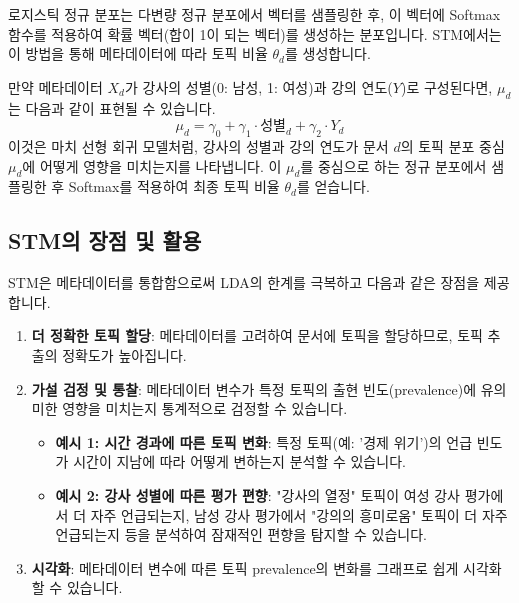 \documentclass[11pt,a4paper]{article}
\theoremstyle{definition}
\begin{document}
\begin{tcolorbox}[definition={로지스틱 정규 분포 (Logistic Normal Distribution)}]
로지스틱 정규 분포는 다변량 정규 분포에서 벡터를 샘플링한 후, 이 벡터에 Softmax 함수를 적용하여 확률 벡터(합이 1이 되는 벡터)를 생성하는 분포입니다. STM에서는 이 방법을 통해 메타데이터에 따라 토픽 비율 $\theta_d$를 생성합니다.
\end{tcolorbox}

\begin{tcolorbox}[example={$\mu_d = X_d \gamma$의 의미}]
만약 메타데이터 $X_d$가 강사의 성별(0: 남성, 1: 여성)과 강의 연도($Y$)로 구성된다면, $\mu_d$는 다음과 같이 표현될 수 있습니다.
\begin{equation*}
\mu_d = \gamma_0 + \gamma_1 \cdot \text{성별}_d + \gamma_2 \cdot Y_d
\end{equation*}
이것은 마치 선형 회귀 모델처럼, 강사의 성별과 강의 연도가 문서 $d$의 토픽 분포 중심 $\mu_d$에 어떻게 영향을 미치는지를 나타냅니다. 이 $\mu_d$를 중심으로 하는 정규 분포에서 샘플링한 후 Softmax를 적용하여 최종 토픽 비율 $\theta_d$를 얻습니다.
\end{tcolorbox}

\subsection{STM의 장점 및 활용}
STM은 메타데이터를 통합함으로써 LDA의 한계를 극복하고 다음과 같은 장점을 제공합니다.

\begin{enumerate}
    \item \textbf{더 정확한 토픽 할당}: 메타데이터를 고려하여 문서에 토픽을 할당하므로, 토픽 추출의 정확도가 높아집니다.
    \item \textbf{가설 검정 및 통찰}: 메타데이터 변수가 특정 토픽의 출현 빈도(prevalence)에 유의미한 영향을 미치는지 통계적으로 검정할 수 있습니다.
    \begin{itemize}
        \item \textbf{예시 1: 시간 경과에 따른 토픽 변화}: 특정 토픽(예: '경제 위기')의 언급 빈도가 시간이 지남에 따라 어떻게 변하는지 분석할 수 있습니다.
        \item \textbf{예시 2: 강사 성별에 따른 평가 편향}: "강사의 열정" 토픽이 여성 강사 평가에서 더 자주 언급되는지, 남성 강사 평가에서 "강의의 흥미로움" 토픽이 더 자주 언급되는지 등을 분석하여 잠재적인 편향을 탐지할 수 있습니다.
    \end{itemize}
    \item \textbf{시각화}: 메타데이터 변수에 따른 토픽 prevalence의 변화를 그래프로 쉽게 시각화할 수 있습니다.
\end{enumerate}
\end{document}
